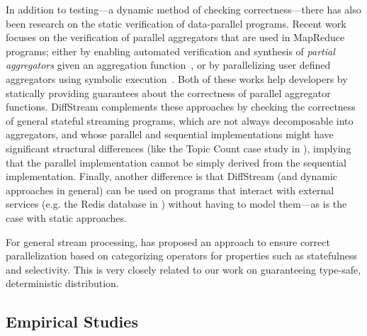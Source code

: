 In addition to testing---a dynamic method of checking
correctness---there has also been research on the static verification
of data-parallel programs. Recent work focuses on the verification of
parallel aggregators that are used in MapReduce programs; either by
enabling automated verification and synthesis of \emph{partial
aggregators} given an aggregation function~\cite{liu2014automating},
or by parallelizing user defined aggregators using symbolic
execution~\cite{raychev2015parallelizing}. Both of these works help
developers by statically providing guarantees about the correctness of
parallel aggregator functions. DiffStream complements these approaches
by checking the correctness of general stateful streaming programs,
which are not always decomposable into aggregators, and whose parallel
and sequential implementations might have significant structural
differences (like the Topic Count case study in
), implying that the parallel implementation cannot be simply
derived from the sequential implementation. Finally, another
difference is that DiffStream (and dynamic approaches in general) can be
used on programs that interact with external services (e.g. the Redis
database in ) without having to model
them---as is the case with static approaches.

For general stream processing, \cite{schneider2013safe} has proposed an approach to ensure correct parallelization based on categorizing operators for properties such as statefulness and selectivity.
This is very closely related to our work on guaranteeing type-safe, deterministic distribution.

\subsection{Empirical Studies}

